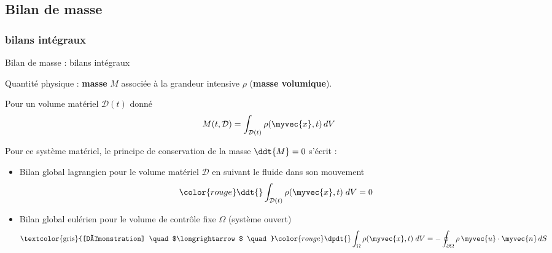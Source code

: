 \subsection{Bilan de masse}

\subsubsection{bilans intégraux}
\begin{frame}{Bilan de masse : bilans intégraux}

\small


Quantité physique : \textbf{masse} $M$ associée à la grandeur intensive $\rho$ (\textbf{masse volumique}).

\bigskip

Pour un volume matériel $\mathcal{D}(t)$ donné 
$$
	M(t, \mathcal{D}) = \int_{\mathcal{D}(t)} \rho(\myvec{x}, t) \, dV
$$

\medskip 

\pause

Pour ce système matériel, le principe de conservation de la masse $\ddt{M} = 0$ s'écrit :

\medskip

\begin{itemize}
\item
	Bilan global lagrangien pour le volume matériel $\mathcal{D}$ en suivant le fluide
	dans son mouvement
	\begin{equation}
		\color{rouge}
		\ddt{} \int_{\mathcal{D}(t)} \rho(\myvec{x}, t) \; dV 
		= 0
		\label{eq:bilan_global_lagrangien_masse}
	\end{equation}
\medskip

\pause

\item
  Bilan global eulérien pour le volume de contrôle fixe $\Omega$ (système ouvert)
	\begin{equation}
		\mbox{\textcolor{gris}{[Démonstration] \quad $\longrightarrow$ \quad}}
		\color{rouge}
		\dpdt{} \int_{\Omega} \rho(\myvec{x}, t) \; dV 
		=
		- \oint_{\partial \Omega} \rho \,  \myvec{u}\cdot \myvec{n} \, dS
		\label{eq:bilan_global_eulerien_masse}
	\end{equation}
\end{itemize}


\end{frame}
